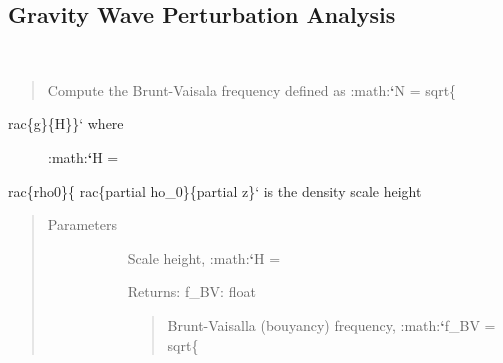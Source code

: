 \documentclass[letterpaper,10pt,english]{sphinxmanual}
\begin{document}
\subsection{Gravity Wave Perturbation Analysis}
\label{\detokenize{stochprop.gravity:module-stochprop.gravity_waves}}\label{\detokenize{stochprop.gravity:gravity-wave-perturbation-analysis}}\label{\detokenize{stochprop.gravity::doc}}

\begin{fulllineitems}
\label{\detokenize{stochprop.gravity:stochprop.gravity_waves.BV_freq}}~\begin{quote}

Compute the Brunt-Vaisala frequency defined as :math:{\color{red}\bfseries{}{}`}N = sqrt\{
\end{quote}
\begin{description}
\item[{rac\{g\}\{H\}\}{}` where }] \leavevmode
:math:{\color{red}\bfseries{}{}`}H =

\end{description}

rac\{rho0\}\{
rac\{partial 
ho\_0\}\{partial z\}{}` is the density scale height
\begin{quote}\begin{description}
\item[{Parameters}] \leavevmode\begin{description}
\item[{}] \leavevmode
Scale height, :math:{\color{red}\bfseries{}{}`}H =

\item[{}] \leavevmode
\item[{}] \leavevmode
\item[{}] \leavevmode
\item[{}] \leavevmode
Returns:
f\_BV: float
\begin{quote}

Brunt-Vaisalla (bouyancy) frequency, :math:{\color{red}\bfseries{}{}`}f\_BV = sqrt\{
\end{quote}

\item[{}] \leavevmode
\end{description}

\end{description}\end{quote}

\end{fulllineitems}
\end{document}
